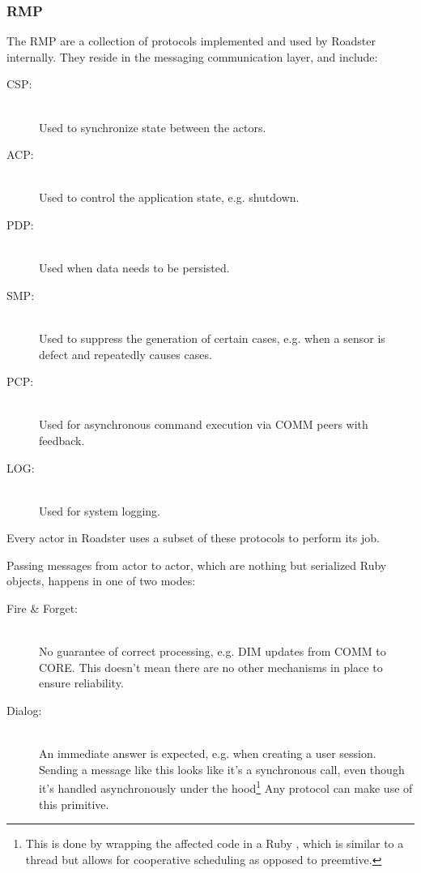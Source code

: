 \subsubsection{RMP}\label{sec:rmp}
The \gls{RMP} are a collection of protocols implemented and used by Roadster
internally. They reside in the messaging communication layer, and include:

\begin{description}
	\item [\gls{CSP}:]\hfill\\
		Used to synchronize state between the actors.
	\item [\gls{ACP}:]\hfill\\
		Used to control the application state, e.g. shutdown.
	\item [\gls{PDP}:]\hfill\\
		Used when data needs to be persisted.
	\item [\gls{SMP}:]\hfill\\
		Used to suppress the generation of certain \glspl{case}, e.g.
		when a sensor is defect and repeatedly causes cases.
	\item [\gls{PCP}:]\hfill\\
		Used for asynchronous command execution via COMM peers with feedback.
	\item [\gls{LOG}:]\hfill\\
		Used for system logging.
\end{description}

Every actor in Roadster uses a subset of these protocols to perform its job.

Passing messages from actor to actor, which are nothing but serialized Ruby
objects, happens in one of two modes:
\begin{description}
\item [Fire \& Forget:]\hfill\\
No guarantee of correct processing, e.g. DIM updates from COMM to CORE. This
doesn't mean there are no other mechanisms in place to ensure reliability.

\item [Dialog:]\hfill\\
An immediate answer is expected, e.g. when creating a user
session. Sending a message like this looks like it's a synchronous call, even
though it's handled asynchronously under the hood\footnote{This is done by
wrapping the affected code in a Ruby , which is similar to a thread
but allows for cooperative scheduling as opposed to preemtive.} Any protocol
can make use of this primitive.
\end{description}

